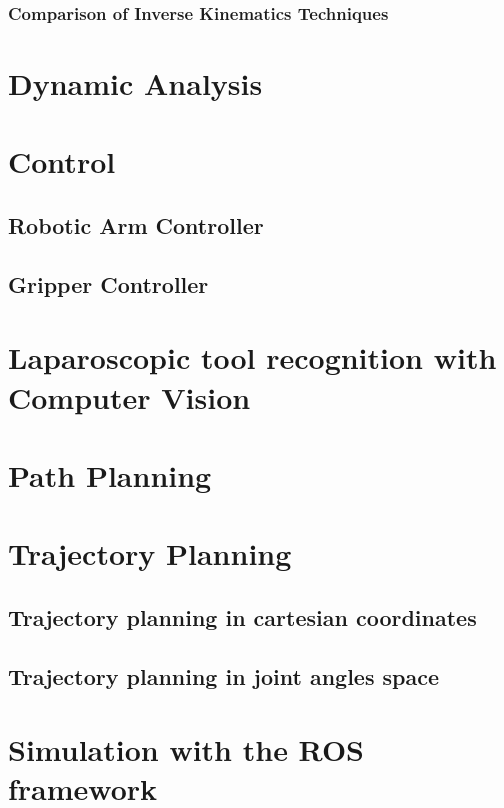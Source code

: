 \documentclass[10pt]{article}
\begin{document}
\subsubsection{Comparison of Inverse Kinematics Techniques}

\section{Dynamic Analysis}

\section{Control}
\subsection{Robotic Arm Controller}
\subsection{Gripper Controller}

\section{Laparoscopic tool recognition with Computer Vision}

\section{Path Planning}

\section{Trajectory Planning}
\subsection{Trajectory planning in cartesian coordinates}
\subsection{Trajectory planning in joint angles space}

\section{Simulation with the ROS framework}



\clearpage
\mbox{}
\printnomenclature
\end{document}
